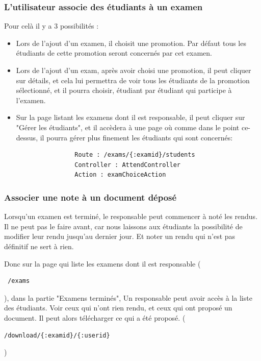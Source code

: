 \documentclass{report}
\begin{document}
      \subsubsection{L'utilisateur associe des étudiants à un examen}
        Pour celà il y a 3 possibilités :
        \begin{itemize}
          \item{
              Lors de l'ajout d'un examen, il choisit une promotion. Par défaut
              tous les étudiants de cette promotion seront concernés par cet
              examen.
            }
          \item{
              Lors de l'ajout d'un exam, après avoir choisi une promotion, il peut
              cliquer sur détails, et cela lui permettra de voir tous les étudiants
              de la promotion sélectionné, et il pourra choisir, étudiant par
              étudiant qui participe à l'examen.
            }
          \item{
              Sur la page listant les examens dont il est responsable, il peut
              cliquer sur "Gérer les étudiants", et il accèdera à une page où
              comme dans le point ce-dessus, il pourra gérer plus finement les
              étudiants qui sont concernés:
              \vspace{1em}
              \begin{verbatim}
                Route : /exams/{:examid}/students
                Controller : AttendController
                Action : examChoiceAction
              \end{verbatim}
            }
        \end{itemize}
      \subsubsection{Associer une note à un document déposé}
        Lorsqu'un examen est terminé, le responsable peut commencer à noté les rendus.
        Il ne peut pas le faire avant, car nous laissons aux étudiants la possibilité
        de modifier leur rendu jusqu'au dernier jour. Et noter un rendu qui n'est pas
        définitif ne sert à rien.

        Donc sur la page qui liste les examens dont il est responsable (
        \begin{verbatim} /exams \end{verbatim}), dans la partie "Examens terminés",
        Un responsable peut avoir accès à la liste des étudiants. Voir ceux qui
        n'ont rien rendu, et ceux qui ont proposé un document. Il peut alors
        télécharger ce qui a été proposé. 
        (\begin{verbatim}/download/{:examid}/{:userid}\end{verbatim})
\end{document}
